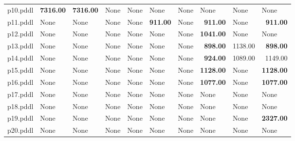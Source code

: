 \documentclass{article}
\begin{document}
\begin{tabular}{@{}lrrrrrrrrr@{}}
p10.pddl & \textbf{7316.00} & \textbf{7316.00} & \multicolumn{1}{|l|}{None} & \multicolumn{1}{|l|}{None} & \multicolumn{1}{|l|}{None} & \multicolumn{1}{|l|}{None} & \multicolumn{1}{|l|}{None} & \multicolumn{1}{|l|}{None} & \multicolumn{1}{|l|}{None} \\
p11.pddl & \multicolumn{1}{|l|}{None} & \multicolumn{1}{|l|}{None} & \multicolumn{1}{|l|}{None} & \multicolumn{1}{|l|}{None} & \textbf{911.00} & \multicolumn{1}{|l|}{None} & \textbf{911.00} & \multicolumn{1}{|l|}{None} & \textbf{911.00} \\
p12.pddl & \multicolumn{1}{|l|}{None} & \multicolumn{1}{|l|}{None} & \multicolumn{1}{|l|}{None} & \multicolumn{1}{|l|}{None} & \multicolumn{1}{|l|}{None} & \multicolumn{1}{|l|}{None} & \textbf{1041.00} & \multicolumn{1}{|l|}{None} & \multicolumn{1}{|l|}{None} \\
p13.pddl & \multicolumn{1}{|l|}{None} & \multicolumn{1}{|l|}{None} & \multicolumn{1}{|l|}{None} & \multicolumn{1}{|l|}{None} & \multicolumn{1}{|l|}{None} & \multicolumn{1}{|l|}{None} & \textbf{898.00} & 1138.00 & \textbf{898.00} \\
p14.pddl & \multicolumn{1}{|l|}{None} & \multicolumn{1}{|l|}{None} & \multicolumn{1}{|l|}{None} & \multicolumn{1}{|l|}{None} & \multicolumn{1}{|l|}{None} & \multicolumn{1}{|l|}{None} & \textbf{924.00} & 1089.00 & 1149.00 \\
p15.pddl & \multicolumn{1}{|l|}{None} & \multicolumn{1}{|l|}{None} & \multicolumn{1}{|l|}{None} & \multicolumn{1}{|l|}{None} & \multicolumn{1}{|l|}{None} & \multicolumn{1}{|l|}{None} & \textbf{1128.00} & \multicolumn{1}{|l|}{None} & \textbf{1128.00} \\
p16.pddl & \multicolumn{1}{|l|}{None} & \multicolumn{1}{|l|}{None} & \multicolumn{1}{|l|}{None} & \multicolumn{1}{|l|}{None} & \multicolumn{1}{|l|}{None} & \multicolumn{1}{|l|}{None} & \textbf{1077.00} & \multicolumn{1}{|l|}{None} & \textbf{1077.00} \\
p17.pddl & \multicolumn{1}{|l|}{None} & \multicolumn{1}{|l|}{None} & \multicolumn{1}{|l|}{None} & \multicolumn{1}{|l|}{None} & \multicolumn{1}{|l|}{None} & \multicolumn{1}{|l|}{None} & \multicolumn{1}{|l|}{None} & \multicolumn{1}{|l|}{None} & \multicolumn{1}{|l|}{None} \\
p18.pddl & \multicolumn{1}{|l|}{None} & \multicolumn{1}{|l|}{None} & \multicolumn{1}{|l|}{None} & \multicolumn{1}{|l|}{None} & \multicolumn{1}{|l|}{None} & \multicolumn{1}{|l|}{None} & \multicolumn{1}{|l|}{None} & \multicolumn{1}{|l|}{None} & \multicolumn{1}{|l|}{None} \\
p19.pddl & \multicolumn{1}{|l|}{None} & \multicolumn{1}{|l|}{None} & \multicolumn{1}{|l|}{None} & \multicolumn{1}{|l|}{None} & \multicolumn{1}{|l|}{None} & \multicolumn{1}{|l|}{None} & \multicolumn{1}{|l|}{None} & \multicolumn{1}{|l|}{None} & \textbf{2327.00} \\
p20.pddl & \multicolumn{1}{|l|}{None} & \multicolumn{1}{|l|}{None} & \multicolumn{1}{|l|}{None} & \multicolumn{1}{|l|}{None} & \multicolumn{1}{|l|}{None} & \multicolumn{1}{|l|}{None} & \multicolumn{1}{|l|}{None} & \multicolumn{1}{|l|}{None} & \multicolumn{1}{|l|}{None} \\
\end{tabular}
\end{document}
